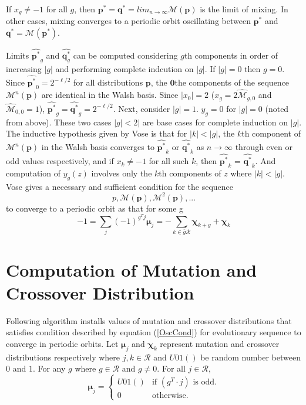 If $x_g \neq −1$ for all $g$, then ${\bm p}^\ast = {\bm q}^\ast = lim_{n \rightarrow \infty} \mathcal{M}({\bm p})$ is the limit of mixing. In other cases, 
mixing converges to a periodic orbit oscillating between ${\bm p}^\ast$ and ${\bm q}^\ast = \mathcal{M}({\bm p}^\ast)$.

Limits $\widehat{{\bm p}^{\ast}}_g$ and $\widehat{{\bm q}^{\ast}_g}$ can be computed considering $g$th components in order of increasing $|g|$ and 
performing complete indcution on $|g|$. If $|g| = 0$ then $g = 0$. Since $\widehat{{\bm p}^\ast}_0 = 2^{-\ell/2}$ for all distributions ${\bm p}$, 
the $\textbf{0}$the components of the sequence $\mathcal{M}^n({\bm p})$ are identical in the Walsh basis. Since $|x_0| = 2$ ($x_g = 2\widehat{\mathcal{M}}_{g,0}$ 
and $\widehat{\mathcal{M}}_{0,0} = 1$), $\widehat{{\bm p}^{\ast}}_g = \widehat{{\bm q}^{\ast}}_g = 2^{-\ell/2}$. Next, consider $|g| = 1$. $y_g = 0$ for $|g| = 0$ 
(noted from above). These two cases $|g| < 2|$ are base cases for complete induction on $|g|$. The inductive hypothesis given by Vose is that 
for $|k| < |g|$, the $k$th component of $\mathcal{M}^n({\bm p})$ in the Walsh basis converges to $\widehat{{\bm p}^{\ast}}_k$ or $\widehat{{\bm q}^{\ast}}_k$ as 
$n \rightarrow \infty$ through even or odd values respectively, and if $x_k \neq -1$ for all such $k$, then 
$\widehat{{\bm p}^{\ast}}_k$ = $\widehat{{\bm q}^{\ast}}_k$. And computation of $y_g(z)$ involves only the $k$th components of $z$ where $|k| < |g|$. 
\newline 
Vose gives a necessary and sufficient condition for the sequence
\[
p, \mathcal{M}({\bm p}), \mathcal{M}^2({\bm p}),...
\]
to converge to a periodic orbit as that for some g
\begin{equation}
\label{OscCond}
-1 = \sum \limits_{j} (-1)^{g^T j} \bm{\mu}_j = - \sum \limits_{k \in \bar{g}\mathcal{R}} \bm{\chi}_{k+g} + \bm{\chi}_k
\end{equation}
 
\section{Computation of Mutation and Crossover Distribution}
Following algorithm installs values of mutation and crossover distributions that satisfies condition described 
by equation (\ref{OscCond}) for evolutionary sequence to converge in periodic orbits.
Let $\bm{\mu}_j$ and $\bm{\chi}_k$ represent mutation and crossover distributions respectively where $j,k \in \mathcal{R}$ 
and $U01()$ be random number between $0$ and $1$. For any $g$ where $g \in \mathcal{R}$ and $g \neq 0$.
For all $j \in \mathcal{R}$,
\[
\bm{\mu}_j = \begin{cases}
    U01() & \text{if $(g^T\cdot j)$ is odd}.\\
    0 & \text{otherwise}.
  \end{cases}
\]

